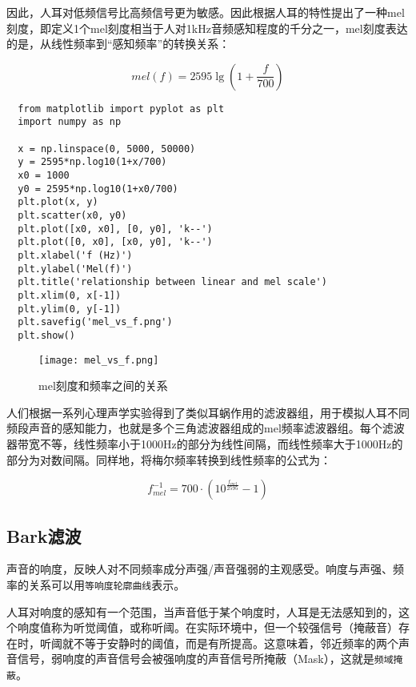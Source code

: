 \documentclass[cn,10pt,math=newtx,citestyle=gb7714-2015,bibstyle=gb7714-2015]{elegantbook}
\begin{document}
因此，人耳对低频信号比高频信号更为敏感。因此根据人耳的特性提出了一种mel刻度，即定义1个mel刻度相当于人对1kHz音频感知程度的千分之一，mel刻度表达的是，从线性频率到“感知频率”的转换关系：

\begin{equation}
  mel(f)=2595\mathop{lg}(1+\frac{f}{700})
\end{equation}

\begin{lstlisting}
  from matplotlib import pyplot as plt
  import numpy as np

  x = np.linspace(0, 5000, 50000)
  y = 2595*np.log10(1+x/700)
  x0 = 1000
  y0 = 2595*np.log10(1+x0/700)
  plt.plot(x, y)
  plt.scatter(x0, y0)
  plt.plot([x0, x0], [0, y0], 'k--')
  plt.plot([0, x0], [x0, y0], 'k--')
  plt.xlabel('f (Hz)')
  plt.ylabel('Mel(f)')
  plt.title('relationship between linear and mel scale')
  plt.xlim(0, x[-1])
  plt.ylim(0, y[-1])
  plt.savefig('mel_vs_f.png')
  plt.show()
\end{lstlisting}

\begin{figure}[htbp]
  \centering
  \texttt{[image: mel\_vs\_f.png]}
  \caption{mel刻度和频率之间的关系 \label{fig:mel_vs_f}}
\end{figure}

人们根据一系列心理声学实验得到了类似耳蜗作用的滤波器组，用于模拟人耳不同频段声音的感知能力，也就是多个三角滤波器组成的mel频率滤波器组。每个滤波器带宽不等，线性频率小于1000Hz的部分为线性间隔，而线性频率大于1000Hz的部分为对数间隔。同样地，将梅尔频率转换到线性频率的公式为：

\begin{equation}
  f_{mel}^{-1}=700\cdot (10^{\frac{f_{mel}}{2595}}-1)
\end{equation}

\subsection{Bark滤波}

声音的响度，反映人对不同频率成分声强/声音强弱的主观感受。响度与声强、频率的关系可以用\lstinline{等响度轮廓曲线}表示。

人耳对响度的感知有一个范围，当声音低于某个响度时，人耳是无法感知到的，这个响度值称为听觉阈值，或称听阈。在实际环境中，但一个较强信号（掩蔽音）存在时，听阈就不等于安静时的阈值，而是有所提高。这意味着，邻近频率的两个声音信号，弱响度的声音信号会被强响度的声音信号所掩蔽（Mask），这就是\lstinline{频域掩蔽}。
\end{document}
